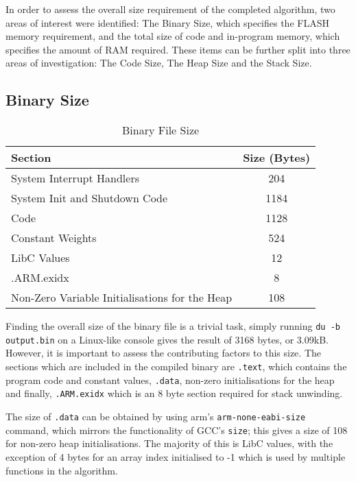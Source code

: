 
In order to assess the overall size requirement of the completed algorithm, two areas of interest were identified: The Binary Size, which specifies the FLASH memory requirement, and the total size of code and in-program memory, which specifies the amount of RAM required. These items can be further split into three areas of investigation: The Code Size, The Heap Size and the Stack Size.

\subsection{Binary Size}

\begin{table}[b]
    \centering
    \begin{tabular}{|l|c|}
        \hline
        Section & Size (Bytes) \\
        \hline
        System Interrupt Handlers & 204 \\
        System Init and Shutdown Code & 1184 \\
        Code & 1128 \\
        Constant Weights & 524 \\
        LibC Values & 12 \\
        .ARM.exidx & 8 \\
        Non-Zero Variable Initialisations for the Heap & 108 \\
        \hline
    \end{tabular}
    \caption{Binary File Size \label{tab:prog-size}}
\end{table}

Finding the overall size of the binary file is a trivial task, simply running \verb|du -b output.bin| on a Linux-like console gives the result of 3168 bytes, or 3.09kB. However, it is important to assess the contributing factors to this size. The sections which are included in the compiled binary are \verb|.text|, which contains the program code and constant values, \verb|.data|, non-zero initialisations for the heap and finally, \verb|.ARM.exidx| which is an 8 byte section required for stack unwinding.

The size of \verb|.data| can be obtained by using arm's \verb|arm-none-eabi-size| command, which mirrors the functionality of GCC's \verb|size|; this gives a size of 108 for non-zero heap initialisations. The majority of this is LibC values, with the exception of 4 bytes for an array index initialised to -1 which is used by multiple functions in the algorithm.

